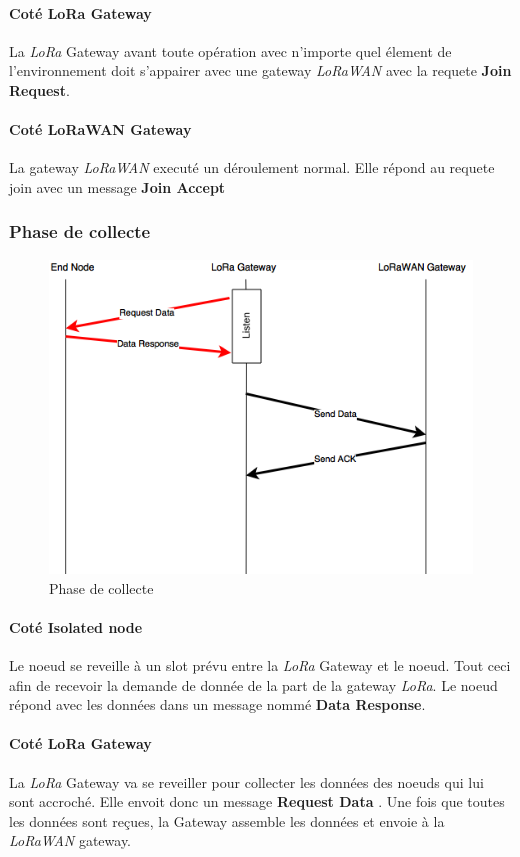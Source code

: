 \documentclass[11pt]{article}
\begin{document}
\paragraph{Coté LoRa Gateway}
La \textit{LoRa} Gateway avant toute opération avec n'importe quel élement de l'environnement doit s'appairer avec une gateway \textit{LoRaWAN} avec la requete  \textbf{Join Request}.
\paragraph{Coté LoRaWAN Gateway}
La gateway \textit{LoRaWAN} executé un déroulement normal. Elle répond au requete join avec un message  \textbf{Join Accept}
\newpage
\subsubsection{Phase de collecte}
\begin{figure}[h!]
\centering
\includegraphics[scale=0.6]{Collect.png} 
\caption{Phase de collecte}
\end{figure}

\paragraph{Coté Isolated node} Le noeud se reveille à un slot prévu entre la \textit{LoRa} Gateway et le noeud. Tout ceci afin de recevoir la demande de donnée de la part de la gateway \textit{LoRa}. Le noeud répond avec les données dans un message nommé  \textbf{Data Response}.
\paragraph{Coté LoRa Gateway}
La \textit{LoRa} Gateway va se reveiller pour collecter les données des noeuds qui lui sont accroché. Elle envoit donc un message  \textbf{Request Data} . Une fois que toutes les données sont reçues, la Gateway assemble les données et envoie à la  \textit{LoRaWAN} gateway. 
\end{document}
